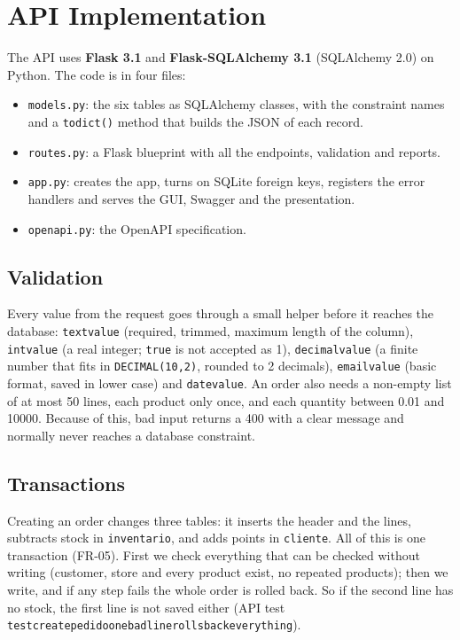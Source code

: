 \documentclass[11pt]{article}
\renewcommand{\_}{\oldus\allowbreak}
\begin{document}
\section{API Implementation}

The API uses \textbf{Flask 3.1} and \textbf{Flask-SQLAlchemy 3.1} (SQLAlchemy 2.0) on Python. The code
is in four files:

\begin{itemize}[itemsep=0.1em]
  \item \texttt{models.py}: the six tables as SQLAlchemy classes, with the constraint names and a
  \texttt{to\_dict()} method that builds the JSON of each record.
  \item \texttt{routes.py}: a Flask blueprint with all the endpoints, validation and reports.
  \item \texttt{app.py}: creates the app, turns on SQLite foreign keys, registers the error handlers
  and serves the GUI, Swagger and the presentation.
  \item \texttt{openapi.py}: the OpenAPI specification.
\end{itemize}

\subsection{Validation}

Every value from the request goes through a small helper before it reaches the database:
\texttt{text\_value} (required, trimmed, maximum length of the column), \texttt{int\_value} (a real
integer; \texttt{true} is not accepted as 1), \texttt{decimal\_value} (a finite number that fits in
\texttt{DECIMAL(10,2)}, rounded to 2 decimals), \texttt{email\_value} (basic format, saved in lower
case) and \texttt{date\_value}. An order also needs a non-empty list of at most 50 lines, each
product only once, and each quantity between 0.01 and 10000. Because of this, bad input returns a
400 with a clear message and normally never reaches a database constraint.

\subsection{Transactions}

Creating an order changes three tables: it inserts the header and the lines, subtracts stock in
\texttt{inventario}, and adds points in \texttt{cliente}. All of this is one transaction (FR-05).
First we check everything that can be checked without writing (customer, store and every product
exist, no repeated products); then we write, and if any step fails the whole order is rolled back.
So if the second line has no stock, the first line is not saved either (API test
\texttt{test\_create\_pedido\_one\_bad\_line\_rolls\_back\_everything}).
\end{document}
